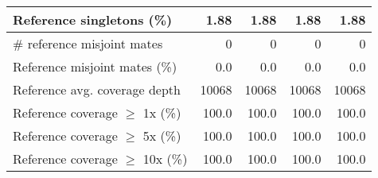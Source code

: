 \documentclass[12pt,a4paper]{article}
\begin{document}
\begin{table}[ht]
\begin{center}
\begin{tabular}{|l*{4}{|r}|}
Reference singletons (\%) & 1.88 & 1.88 & 1.88 & 1.88 \\ \hline
\# reference misjoint mates & 0 & 0 & 0 & 0 \\ \hline
Reference misjoint mates (\%) & 0.0 & 0.0 & 0.0 & 0.0 \\ \hline
Reference avg. coverage depth & 10068 & 10068 & 10068 & 10068 \\ \hline
Reference coverage $\geq$ 1x (\%) & 100.0 & 100.0 & 100.0 & 100.0 \\ \hline
Reference coverage $\geq$ 5x (\%) & 100.0 & 100.0 & 100.0 & 100.0 \\ \hline
Reference coverage $\geq$ 10x (\%) & 100.0 & 100.0 & 100.0 & 100.0 \\ \hline
\end{tabular}
\end{center}
\end{table}
\end{document}
